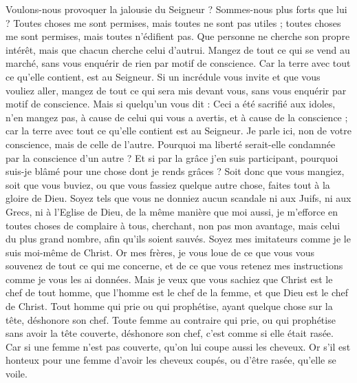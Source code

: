 \begin{multicols}{2}
Voulons-nous provoquer la jalousie du Seigneur ? Sommes-nous plus forts que lui ?
Toutes choses me sont permises, mais toutes ne sont pas utiles ; toutes choses me sont permises, mais toutes n'édifient pas.
Que personne ne cherche son propre intérêt, mais que chacun cherche celui d'autrui.
Mangez de tout ce qui se vend au marché, sans vous enquérir de rien par motif de conscience.
Car la terre avec tout ce qu'elle contient, est au Seigneur.
Si un incrédule vous invite et que vous vouliez aller, mangez de tout ce qui sera mis devant vous, sans vous enquérir par motif de conscience.
Mais si quelqu'un vous dit : Ceci a été sacrifié aux idoles, n'en mangez pas, à cause de celui qui vous a avertis, et à cause de la conscience ; car la terre avec tout ce qu'elle contient est au Seigneur.
Je parle ici, non de votre conscience, mais de celle de l'autre. Pourquoi ma liberté serait-elle condamnée par la conscience d'un autre ?
Et si par la grâce j'en suis participant, pourquoi suis-je blâmé pour une chose dont je rends grâces ?
Soit donc que vous mangiez, soit que vous buviez, ou que vous fassiez quelque autre chose, faites tout à la gloire de Dieu.
Soyez tels que vous ne donniez aucun scandale ni aux Juifs, ni aux Grecs, ni à l'Eglise de Dieu,
de la même manière que moi aussi, je m'efforce en toutes choses de complaire à tous, cherchant, non pas mon avantage, mais celui du plus grand nombre, afin qu'ils soient sauvés.
\VerseOne{}Soyez mes imitateurs comme je le suis moi-même de Christ.
Or mes frères, je vous loue de ce que vous vous souvenez de tout ce qui me concerne, et de ce que vous retenez mes instructions comme je vous les ai données.
Mais je veux que vous sachiez que Christ est le chef de tout homme, que l'homme est le chef de la femme, et que Dieu est le chef de Christ.
Tout homme qui prie ou qui prophétise, ayant quelque chose sur la tête, déshonore son chef.
Toute femme au contraire qui prie, ou qui prophétise sans avoir la tête couverte, déshonore son chef, c'est comme si elle était rasée.
Car si une femme n'est pas couverte, qu'on lui coupe aussi les cheveux. Or s'il est honteux pour une femme d'avoir les cheveux coupés, ou d'être rasée, qu'elle se voile.

\end{multicols}
